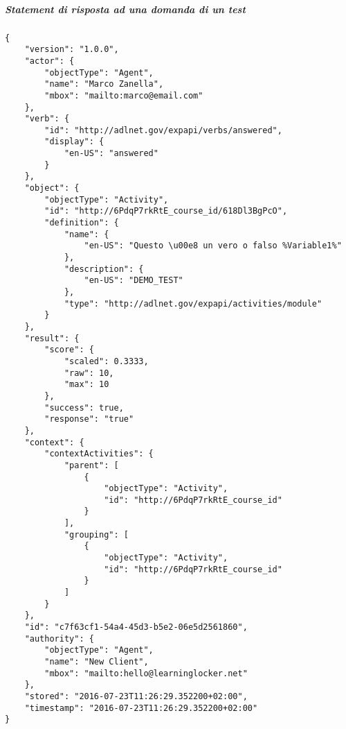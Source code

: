     \subparagraph*{Statement di risposta ad una domanda di un test}\hfill \break
    \begin{lstlisting}
{
    "version": "1.0.0",
    "actor": {
        "objectType": "Agent",
        "name": "Marco Zanella",
        "mbox": "mailto:marco@email.com"
    },
    "verb": {
        "id": "http://adlnet.gov/expapi/verbs/answered",
        "display": {
            "en-US": "answered"
        }
    },
    "object": {
        "objectType": "Activity",
        "id": "http://6PdqP7rkRtE_course_id/618Dl3BgPcO",
        "definition": {
            "name": {
                "en-US": "Questo \u00e8 un vero o falso %Variable1%"
            },
            "description": {
                "en-US": "DEMO_TEST"
            },
            "type": "http://adlnet.gov/expapi/activities/module"
        }
    },
    "result": {
        "score": {
            "scaled": 0.3333,
            "raw": 10,
            "max": 10
        },
        "success": true,
        "response": "true"
    },
    "context": {
        "contextActivities": {
            "parent": [
                {
                    "objectType": "Activity",
                    "id": "http://6PdqP7rkRtE_course_id"
                }
            ],
            "grouping": [
                {
                    "objectType": "Activity",
                    "id": "http://6PdqP7rkRtE_course_id"
                }
            ]
        }
    },
    "id": "c7f63cf1-54a4-45d3-b5e2-06e5d2561860",
    "authority": {
        "objectType": "Agent",
        "name": "New Client",
        "mbox": "mailto:hello@learninglocker.net"
    },
    "stored": "2016-07-23T11:26:29.352200+02:00",
    "timestamp": "2016-07-23T11:26:29.352200+02:00"
}
    \end{lstlisting}

